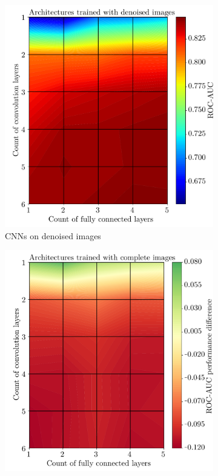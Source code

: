 \begin{figure}
\centering
\begin{subfigure}{.5\textwidth}
  \centering
  \includegraphics[scale=0.35]{Plots/Architectures_AUC_denoised.pdf}
  \caption{CNNs on denoised images}
  \label{fig:heatmap_denoised}
\end{subfigure}%
\begin{subfigure}{.5\textwidth}
  \centering
  \includegraphics[scale=0.35]{Plots/Architectures_AUC_noised.pdf}

\end{subfigure}
\end{figure}
